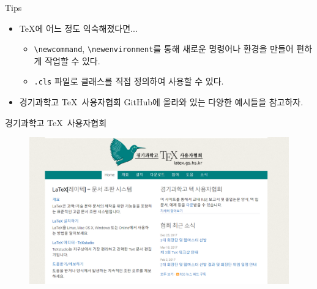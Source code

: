 \documentclass[12pt]{gshs_lecture}
\begin{document}
\begin{frame}[t]{Tips}

\begin{itemize}
	\item \TeX 에 어느 정도 익숙해졌다면...
	\begin{itemize}
		\item \texttt{\textbackslash newcommand}, \texttt{\textbackslash newenvironment}를 통해 새로운 명령어나 환경을 만들어 편하게 작업할 수 있다.
		\item \texttt{.cls} 파일로 클래스를 직접 정의하여 사용할 수 있다.
	\end{itemize}
	\vskip 1pc
	\item 경기과학고 \TeX\ 사용자협회 GitHub에 올라와 있는 다양한 예시들을 참고하자.
\end{itemize}

\end{frame}

\begin{frame}[t]{경기과학고 \TeX\ 사용자협회}
	\begin{figure}[h]
		\centering
		\includegraphics[width=\textwidth]{./pictures/homepage.png}
	\end{figure}
\end{frame}
\end{document}
